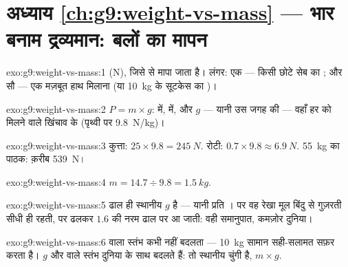 \section*{अध्याय \ref{ch:g9:weight-vs-mass} --- भार बनाम द्रव्यमान: बलों का मापन}

\begin{solution}{exo:g9:weight-vs-mass:1}
 (\unit{N}), जिसे  से मापा जाता है। लंगर: एक  ---
किसी छोटे सेब का ; और सौ --- एक मज़बूत हाथ मिलाना (या \qty{10}{kg}
के सूटकेस का )।
\end{solution}

\begin{solution}{exo:g9:weight-vs-mass:2}
$P = m \times g$:   में,   में, और $g$ ---
यानी उस जगह की  --- वहाँ हर  को मिलने वाले
खिंचाव के  (पृथ्वी पर \qty{9.8}{N/kg})।
\end{solution}

\begin{solution}{exo:g9:weight-vs-mass:3}
कुत्ता: $25 \times 9.8 = \qty{245}{N}$. रोटी: $0.7 \times 9.8
\approx \qty{6.9}{N}$. \qty{55}{kg} का पाठक: क़रीब \qty{539}{N}।
\end{solution}

\begin{solution}{exo:g9:weight-vs-mass:4}
$m = 14.7 \div 9.8 = \qty{1.5}{kg}$.
\end{solution}

\begin{solution}{exo:g9:weight-vs-mass:5}
ढाल ही स्थानीय $g$ है --- यानी  प्रति ।  पर वह
रेखा मूल बिंदु से गुज़रती सीधी ही रहती, पर ढलकर $1.6$ की नरम ढाल पर आ
जाती: वही समानुपात, कमज़ोर दुनिया।
\end{solution}

\begin{solution}{exo:g9:weight-vs-mass:6}
 वाला स्तंभ कभी नहीं बदलता --- \qty{10}{kg} सामान सही-सलामत
सफ़र करता है। $g$ और  वाले स्तंभ दुनिया के साथ बदलते हैं:  तो
स्थानीय चुंगी है, $m \times g$.
\end{solution}

